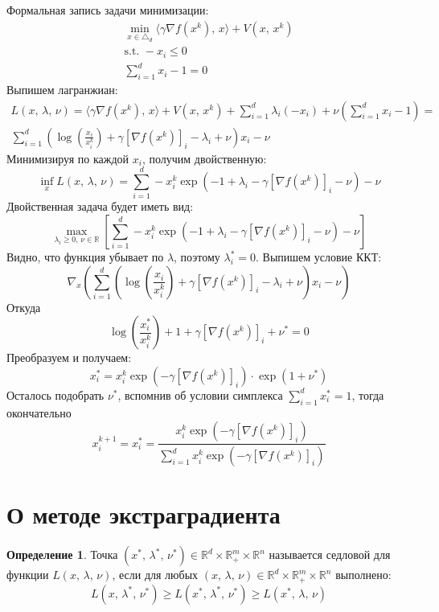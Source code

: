 \documentclass[a4paper,12pt]{article}
\renewcommand{\leq}{\ensuremath{\leqslant}}
\renewcommand{\geq}{\ensuremath{\geqslant}}
\theoremstyle{plain}
\theoremstyle{definition}
\newtheorem{definition}{Определение}[section]
\theoremstyle{remark}
\begin{document}
Формальная запись задачи минимизации:
\begin{align*}
	\min_{x \in \triangle_d} \langle \gamma\nabla f(x^k),\, x\rangle + V(x,\, x^k) \\
	\text{s.t. } -x_i \leq 0                                                       \\
	\sum_{i = 1}^d x_i - 1 = 0
\end{align*}
Выпишем лагранжиан:
\begin{align*}
	L(x,\, \lambda,\, \nu) = \langle \gamma\nabla f(x^k),\, x\rangle + V(x,\, x^k) + \sum_{i = 1}^d \lambda_i (-x_i) + \nu\left(\sum_{i = 1}^d x_i - 1\right) = \\
	\sum_{i = 1}^d\left(\log\left(\frac{x_i}{x_i^k}\right) + \gamma[\nabla f(x^k)]_i - \lambda_i + \nu\right)x_i - \nu
\end{align*}
Минимизируя по каждой $x_i$, получим двойственную:
\[
	\inf_xL(x,\, \lambda,\, \nu) = \sum_{i = 1}^d -x_i^k\exp(-1 + \lambda_i - \gamma[\nabla f(x^k)]_i - \nu) - \nu
\]
Двойственная задача будет иметь вид:
\[
	\max_{\lambda_i \geq 0,\, \nu \in \mathbb{R}} \left[\sum_{i = 1}^d -x_i^k\exp(-1 + \lambda_i - \gamma[\nabla f(x^k)]_i - \nu) - \nu\right]
\]
Видно, что функция убывает по $\lambda$, поэтому $\lambda_i^* = 0$. Выпишем условие ККТ:
\[
	\nabla_x\left(\sum_{i = 1}^d\left(\log\left(\frac{x_i}{x_i^k}\right) + \gamma[\nabla f(x^k)]_i - \lambda_i + \nu\right)x_i - \nu\right)
\]
Откуда
\[
	\log\left(\frac{x_i^*}{x_i^k}\right) + 1 + \gamma[\nabla f(x^k)]_i + \nu^* = 0
\]
Преобразуем и получаем:
\[
	x_i^* = x_i^k\exp(-\gamma[\nabla f(x^k)]_i)\cdot\exp(1 + \nu^*)
\]
Осталось подобрать $\nu^*$, вспомнив об условии симплекса $\sum_{i = 1}^d x_i^* = 1$, тогда окончательно
\[
	x_i^{k + 1} = x_i^* = \frac{x_i^k\exp(-\gamma[\nabla f(x^k)]_i)}{\sum_{i = 1}^d x_i^k \exp(-\gamma[\nabla f(x^k)]_i)}
\]

\section{О методе экстраградиента}
\begin{definition}
	Точка $(x^*,\, \lambda^*,\, \nu^*) \in \mathbb{R}^d \times \mathbb{R}^m_+ \times \mathbb{R}^n$ называется седловой для функции $L(x,\, \lambda,\, \nu)$, если для любых $(x,\, \lambda,\, \nu) \in \mathbb{R}^d \times \mathbb{R}^m_+ \times \mathbb{R}^n$ выполнено:
	\[
		L(x,\, \lambda^*,\, \nu^*) \geq L(x^*,\, \lambda^*,\, \nu^*) \geq L(x^*,\, \lambda,\, \nu)
	\]
\end{definition}
\end{document}

